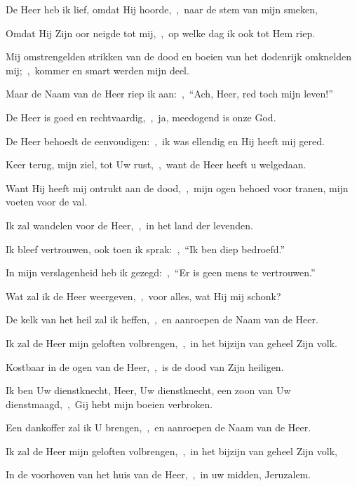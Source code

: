 \documentclass[12pt,twoside,a5paper]{article}
\begin{document}
\begin{halfparskip}
  De Heer heb ik lief, omdat Hij hoorde,~\sep\ naar de stem van mijn smeken,


  Omdat Hij Zijn oor neigde tot mij,~\sep\ op welke dag ik ook tot Hem riep.

  Mij omstrengelden strikken van de dood en boeien van het dodenrijk omknelden mij;~\sep\ kommer en smart werden mijn deel.

  Maar de Naam van de Heer riep ik aan:~\sep\ ``Ach, Heer, red toch mijn leven!''

  De Heer is goed en rechtvaardig,~\sep\ ja, meedogend is onze God.

  De Heer behoedt de eenvoudigen:~\sep\ ik was ellendig en Hij heeft mij gered.

  Keer terug, mijn ziel, tot Uw rust,~\sep\ want de Heer heeft u welgedaan.

  Want Hij heeft mij ontrukt aan de dood,~\sep\ mijn ogen behoed voor tranen, mijn voeten voor de val.

  Ik zal wandelen voor de Heer,~\sep\ in het land der levenden.

  Ik bleef vertrouwen, ook toen ik sprak:~\sep\ ``Ik ben diep bedroefd.''

  In mijn verslagenheid heb ik gezegd:~\sep\ ``Er is geen mens te vertrouwen.''

  Wat zal ik de Heer weergeven,~\sep\ voor alles, wat Hij mij schonk?

  De kelk van het heil zal ik heffen,~\sep\ en aanroepen de Naam van de Heer.

  Ik zal de Heer mijn geloften volbrengen,~\sep\ in het bijzijn van geheel Zijn volk.

  Kostbaar in de ogen van de Heer,~\sep\ is de dood van Zijn heiligen.

  Ik ben Uw dienstknecht, Heer, Uw dienstknecht, een zoon van Uw dienstmaagd,~\sep\ Gij hebt mijn boeien verbroken.

  Een dankoffer zal ik U brengen,~\sep\ en aanroepen de Naam van de Heer.

  Ik zal de Heer mijn geloften volbrengen,~\sep\ in het bijzijn van geheel Zijn volk,

  In de voorhoven van het huis van de Heer,~\sep\ in uw midden, Jeruzalem.
\end{halfparskip}

\end{document}
